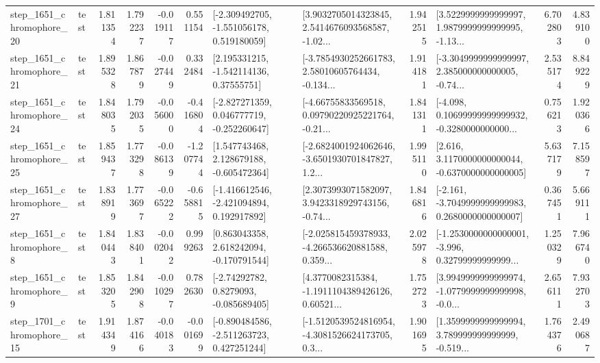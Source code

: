 \begin{tabular}{llrrrrllrlrr}
 step\_1651\_chromophore\_20 &      test &      1.811354 &    1.792237 &     -0.019117 &  0.551154 &   [-2.309492705, -1.551056178, 0.519180059] &  [3.9032705014323845, 2.5414676093568587, -1.02... &       1.942515 &  [3.5229999999999997, 1.9879999999999995, -1.13... &            6.702803 &          4.839100 \\
 step\_1651\_chromophore\_21 &      test &      1.895328 &    1.867879 &     -0.027449 &  0.332484 &     [2.195331215, -1.542114136, 0.37555751] &  [-3.7854930252661783, 2.58010605764434, -0.134... &       1.914181 &  [-3.3049999999999997, 2.385000000000005, -0.74... &            2.535174 &          8.849229 \\
 step\_1651\_chromophore\_24 &      test &      1.848035 &    1.792035 &     -0.056000 & -0.416804 &   [-2.827271359, 0.046777719, -0.252260647] &  [-4.66755833569518, 0.09790220925221764, -0.21... &       1.841311 &  [-4.098, 0.10699999999999932, -0.3280000000000... &            0.756213 &          1.920366 \\
 step\_1651\_chromophore\_25 &      test &      1.859437 &    1.773298 &     -0.086139 & -1.207744 &    [1.547743468, 2.128679188, -0.605472364] &  [-2.6824001924062646, -3.6501930701847827, 1.2... &       1.995110 &   [2.616, 3.1170000000000044, -0.6370000000000005] &            5.637179 &          7.158597 \\
 step\_1651\_chromophore\_27 &      test &      1.838919 &    1.773697 &     -0.065222 & -0.658815 &   [-1.416612546, -2.421094894, 0.192917892] &  [2.3073993071582097, 3.9423318929743156, -0.74... &       1.846816 &  [-2.161, -3.7049999999999983, 0.2680000000000007] &            0.367451 &          5.669111 \\
  step\_1651\_chromophore\_8 &      test &      1.840443 &    1.838401 &     -0.002042 &  0.999263 &    [0.863043358, 2.618242094, -0.170791544] &  [-2.025815459378933, -4.266536620881588, 0.359... &       2.025978 &  [-1.2530000000000001, -3.996, 0.32799999999999... &            1.250329 &          7.966740 \\
  step\_1651\_chromophore\_9 &      test &      1.853205 &    1.842908 &     -0.010297 &  0.782630 &      [-2.74292782, 0.8279093, -0.085689405] &  [4.3770082315384, -1.1911104389426126, 0.60521... &       1.752723 &  [3.9949999999999974, -1.0779999999999998, -0.0... &            2.656111 &          7.932703 \\
 step\_1701\_chromophore\_15 &      test &      1.914349 &    1.874166 &     -0.040183 & -0.001699 &   [-0.890484586, -2.511263723, 0.427251244] &  [-1.5120539524816954, -4.3081526624173705, 0.3... &       1.901695 &  [1.3599999999999994, 3.789999999999999, -0.519... &            1.764376 &          2.490687 \\

\end{tabular}
